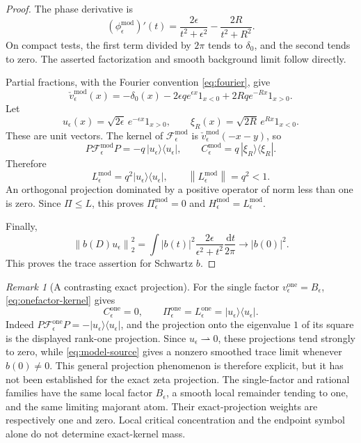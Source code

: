 \documentclass[11pt]{article}
\numberwithin{equation}{section}
\theoremstyle{definition}
\theoremstyle{remark}
\newtheorem{remark}[theorem]{Remark}
\newcommand{\Fcal}{\mathcal F}
\newcommand{\norm}[1]{\left\lVert #1\right\rVert}
\newcommand{\dd}{\,\mathrm d}
\begin{document}
\begin{proof}
The phase derivative is
\begin{equation}\label{eq:model-derivative}
(\phi_\epsilon^{\mathrm{mod}})'(t)
=\frac{2\epsilon}{t^2+\epsilon^2}
-\frac{2R}{t^2+R^2}.
\end{equation}
On compact tests, the first term divided by \(2\pi\) tends
to \(\delta_0\), and the second tends to zero. The asserted
factorization and smooth background limit follow directly.

Partial fractions, with the Fourier convention \eqref{eq:fourier},
give
\begin{equation}\label{eq:model-kernel}
\check v_\epsilon^{\mathrm{mod}}(x)
=-\delta_0(x)-2\epsilon q e^{\epsilon x}1_{x<0}
+2Rq e^{-Rx}1_{x>0}.
\end{equation}
Let
\[
u_\epsilon(x)=\sqrt{2\epsilon}\,e^{-\epsilon x}1_{x>0},
\qquad
\xi_R(x)=\sqrt{2R}\,e^{Rx}1_{x<0}.
\]
These are unit vectors. The kernel of \(\Fcal_\epsilon^{\mathrm{mod}}\)
is \(\check v_\epsilon^{\mathrm{mod}}(-x-y)\), so
\begin{equation}\label{eq:model-blocks}
P\Fcal_\epsilon^{\mathrm{mod}}P
=-q\,|u_\epsilon\rangle\langle u_\epsilon|,
\qquad
C_\epsilon^{\mathrm{mod}}
=q\,|\xi_R\rangle\langle\xi_R|.
\end{equation}
Therefore
\[
L_\epsilon^{\mathrm{mod}}
=q^2|u_\epsilon\rangle\langle u_\epsilon|,\qquad
\norm{L_\epsilon^{\mathrm{mod}}}=q^2<1.
\]
An orthogonal projection dominated by a positive operator of
norm less than one is zero. Since \(\Pi\le L\), this proves
\(\Pi_\epsilon^{\mathrm{mod}}=0\) and \(H_\epsilon^{\mathrm{mod}}=L_\epsilon^{\mathrm{mod}}\).

Finally,
\begin{equation}\label{eq:model-source}
\norm{b(D)u_\epsilon}_2^2
=\int |b(t)|^2
\frac{2\epsilon}{\epsilon^2+t^2}\frac{\dd t}{2\pi}
\longrightarrow |b(0)|^2.
\end{equation}
This proves the trace assertion for Schwartz \(b\).
\end{proof}

\begin{remark}[A contrasting exact projection]\label{rem:onefactor}
For the single factor \(v_\epsilon^{\mathrm{one}}=B_\epsilon\),
\eqref{eq:onefactor-kernel} gives
\[
C_\epsilon^{\mathrm{one}}=0,\qquad
\Pi_\epsilon^{\mathrm{one}}=L_\epsilon^{\mathrm{one}}
=|u_\epsilon\rangle\langle u_\epsilon|.
\]
Indeed \(P\Fcal_\epsilon^{\mathrm{one}}P
=-|u_\epsilon\rangle\langle u_\epsilon|\), and the projection onto
the eigenvalue \(1\) of its square is the displayed rank-one projection.
Since \(u_\epsilon\rightharpoonup0\), these projections tend strongly
to zero, while \eqref{eq:model-source} gives a nonzero smoothed trace
limit whenever \(b(0)\ne0\). This general projection phenomenon is
therefore explicit, but it has not been established for the exact zeta
projection. The single-factor and rational families have the same local
factor \(B_\epsilon\), a smooth local remainder tending to one, and
the same limiting majorant atom. Their exact-projection weights are
respectively one and zero. Local critical concentration and the endpoint
symbol alone do not determine exact-kernel mass.
\end{remark}
\end{document}

